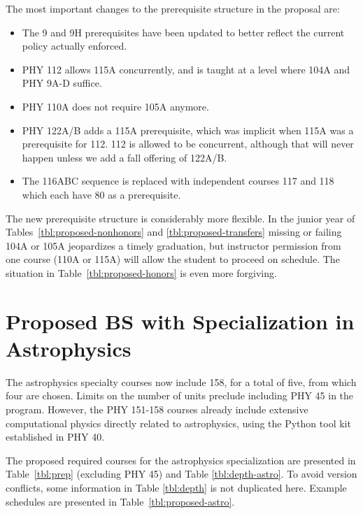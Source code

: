 \documentclass[12pt]{article}
\begin{document}
The most important changes to the prerequisite structure in the proposal are:
\begin{itemize}
\item The 9 and 9H prerequisites have been updated to better reflect the current policy actually enforced.
\item PHY 112 allows 115A concurrently, and is taught at a level where 104A and PHY 9A-D suffice.  
\item PHY 110A does not require 105A anymore. 
\item PHY 122A/B adds a 115A prerequisite, which was implicit when
  115A was a prerequisite for 112.  112 is allowed to be
  concurrent, although that will never happen unless we add a fall
  offering of 122A/B.
\item The 116ABC sequence is replaced with independent courses 117 and
  118 which each have 80 as a prerequisite.

\end{itemize}
The new prerequisite structure is considerably more flexible.  In the
junior year of Tables~\ref{tbl:proposed-nonhonors} and
\ref{tbl:proposed-transfers} missing or failing 104A or 105A
jeopardizes a timely graduation, but instructor permission from one
course (110A or 115A) will allow the student to proceed on schedule.
The situation in Table~\ref{tbl:proposed-honors} is even more
forgiving.


\section{Proposed BS with Specialization in Astrophysics}
\label{sec:astro}
The astrophysics specialty courses now include 158, for a total of
five, from which four are chosen.  Limits on the number of units
preclude including PHY 45 in the
program.  However, the PHY 151-158 courses already include extensive
computational physics directly related to astrophysics, using the
Python tool kit established in PHY 40.

The proposed required courses for the astrophysics specialization are
presented in Table~\ref{tbl:prep} (excluding PHY 45) and Table
\ref{tbl:depth-astro}.  To avoid version conflicts, some information
in Table \ref{tbl:depth} is not duplicated here.  Example schedules
are presented in Table~\ref{tbl:proposed-astro}.
\end{document}
